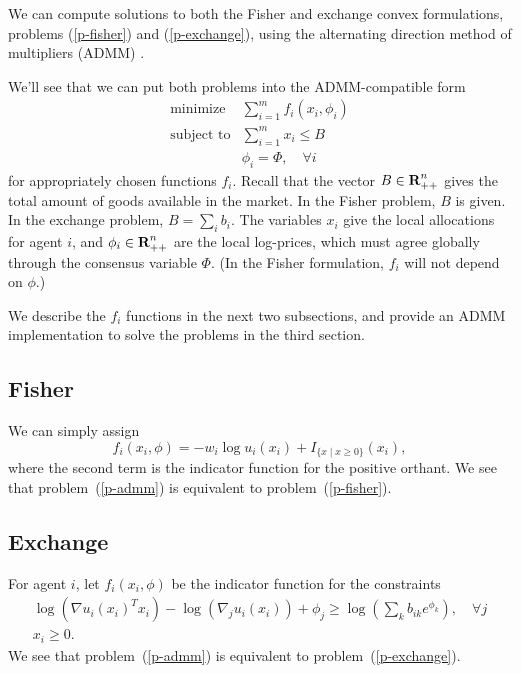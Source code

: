 \documentclass[12pt]{article}
\begin{document}
We can compute solutions to both the Fisher and exchange convex
formulations, problems (\ref{p-fisher}) and (\ref{p-exchange}), using
the alternating direction method of multipliers (ADMM) \cite{boyd2011distributed, parikh2013proximal}.

We'll see that we can put both problems into the ADMM-compatible form
\begin{equation}
\label{p-admm}
\begin{array}{ll}
\mbox{minimize} & \sum_{i=1}^m f_i(x_i, \phi_i) \\
\mbox{subject to} & \sum_{i=1}^m x_i \leq B\\
& \phi_i = \Phi, \quad \forall i
\end{array}
\end{equation}
for appropriately chosen functions $f_i$.
Recall that the vector $B \in {\mbox{\bf R}}^n_{++}$ gives the total
amount of goods available in the market. In the Fisher problem,
$B$ is given.
In the exchange problem, $B = \sum_i b_i$.
The variables $x_i$ give the local allocations for agent $i$, and
$\phi_i \in {\mbox{\bf R}}^n_{++}$
are the local log-prices, which must agree globally through the
consensus variable $\Phi$.
(In the Fisher formulation, $f_i$ will not depend on $\phi$.)

We describe the $f_i$ functions in the next two subsections, and provide an
ADMM implementation to solve the problems in the third section.

\subsection{Fisher}
We can simply assign
\[
f_i(x_i, \phi) = -w_i \log u_i(x_i) + I_{\lbrace x \mid x \geq 0 \rbrace}(x_i),
\]
where the second term is the indicator function for the positive orthant.
We see that problem~(\ref{p-admm}) is equivalent to
problem~(\ref{p-fisher}).

\subsection{Exchange}

For agent $i$, let $f_i(x_i, \phi)$ be the indicator function for the
constraints
\[
\begin{array}{c}
\log(\nabla u_i(x_i)^T x_i) - \log(\nabla_j u_i(x_i)) + \phi_j \geq  \log\left(\sum_k b_{ik} e^{\phi_{k}}\right),\quad \forall j\\
x_i \geq 0.
\end{array}
\]
We see that problem~(\ref{p-admm}) is equivalent to problem~(\ref{p-exchange}).
\end{document}
